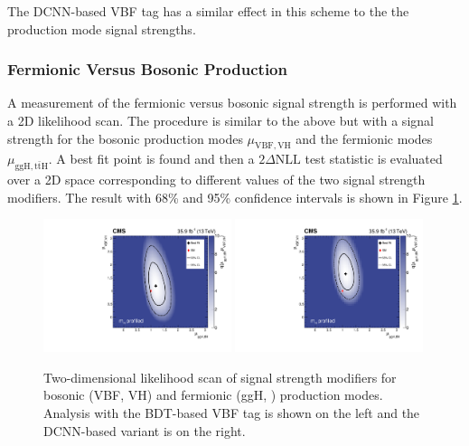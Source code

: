 The DCNN-based VBF tag has a similar effect in this scheme to the the production mode signal strengths. 






\subsubsection{Fermionic Versus Bosonic Production}
A measurement of the fermionic versus bosonic signal strength is performed with a 2D likelihood scan.
The procedure is similar to the above but with a signal strength for the bosonic production modes $\mu_{\mathrm{VBF},\mathrm{VH}}$ and the fermionic modes $\mu_{\mathrm{ggH},\mathrm{t\bar{t}H}}$.
A best fit point is found and then a $2\Delta\mathrm{NLL}$ test statistic is evaluated over a 2D space corresponding to different values of the two signal strength modifiers. 
The result with 68\% and 95\% confidence intervals is shown in Figure \ref{fig:stats_results:fermionic_bosonic}. 
\begin{figure}[h!]
    \begin{center}
        \includegraphics[width=0.49\textwidth]{figures/stats_results/CMS-HIG-16-040_Figure_019.pdf}
        \includegraphics[width=0.49\textwidth]{figures/stats_results/RVRFScanProfileMH_col.pdf}
    \end{center}
    \caption{Two-dimensional likelihood scan of signal strength modifiers for bosonic (VBF, VH) and fermionic (ggH, \ttH) production modes. Analysis with the BDT-based VBF tag is shown on the left and the DCNN-based variant is on the right.}
        \label{fig:stats_results:fermionic_bosonic}
\end{figure}

